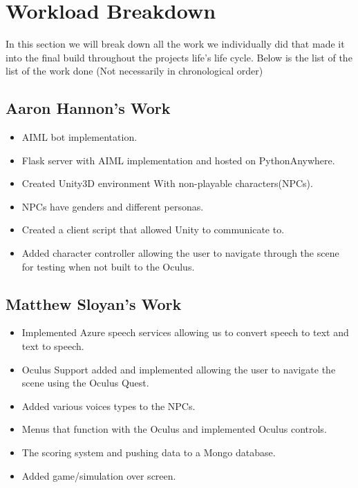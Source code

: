 \section{Workload Breakdown}
In this section we will break down all the work we individually did that made it into the final build throughout the projects life's life cycle. Below is the list of the list of the work done (Not necessarily in chronological order)

\subsection{Aaron Hannon's Work}
\begin{itemize}
    \item AIML bot implementation.
    \item Flask server with AIML implementation and hosted on PythonAnywhere.
    \item Created Unity3D environment With non-playable characters(NPCs).
    \item NPCs have genders and different personas.
    \item Created a client script that allowed Unity to communicate to.
    \item Added character controller allowing the user to navigate through the scene for testing when not built to the Oculus.
\end{itemize}


\subsection{Matthew Sloyan's Work}
\begin{itemize}
    \item Implemented Azure speech services allowing us to convert speech to text and text to speech.
    \item Oculus Support added and implemented allowing the user to navigate the scene using the Oculus Quest.
    \item Added various voices types to the NPCs.
    \item Menus that function with the Oculus and implemented Oculus controls.
    \item The scoring system and pushing data to a Mongo database.
    \item Added game/simulation over screen.
\end{itemize}

